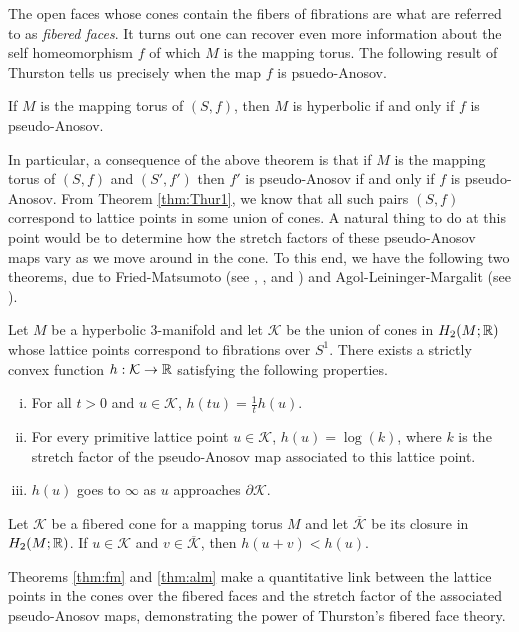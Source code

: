 The open faces whose cones contain the fibers of fibrations are what are referred to as
\emph{fibered faces}.  It turns out one can recover even more information about the self
homeomorphism $f$ of which $M$ is the mapping torus. The following result of Thurston tells us
precisely when the map $f$ is psuedo-Anosov.

\begin{thm}
    \label{thm:ThurHyp}
  If $M$ is the mapping torus of $(S, f)$, then $M$ is hyperbolic if and only if $f$ is pseudo-Anosov.
\end{thm}

In particular, a consequence of the above theorem is that if $M$ is the mapping torus of $(S, f)$
and $(S', f')$ then $f'$ is pseudo-Anosov if and only if $f$ is pseudo-Anosov. From Theorem
\ref{thm:Thur1}, we know that all such pairs $(S, f)$ correspond to lattice points in some union of
cones. A natural thing to do at this point would be to determine how the stretch factors of these
pseudo-Anosov maps vary as we move around in the cone. To this end, we have the following two
theorems, due to Fried-Matsumoto (see \cite{fried1982flow}, \cite{fried1983transitive}, and
\cite{matsumoto1987topological}) and Agol-Leininger-Margalit (see \cite{agol6983pseudo}).

\begin{thm}
  \label{thm:fm}
  Let $M$ be a hyperbolic $3$-manifold and let $\mathcal{K}$ be the union of cones in
  $H_2(M; \mathbb{R})$ whose lattice points correspond to fibrations over $S^1$.  There exists a strictly
  convex function $h: \mathcal{K} \to \mathbb{R}$ satisfying the following properties.
  \begin{enumerate}[(i)]
  \item For all $t > 0$ and $u \in \mathcal{K}$, $h(tu) =  \frac{1}{t}h(u)$.
  \item For every primitive lattice point $u \in \mathcal{K}$, $h(u) = \log(k)$, where $k$ is the
    stretch factor of the pseudo-Anosov map associated to this lattice point.
  \item $h(u)$ goes to $\infty$ as $u$ approaches $\partial \mathcal{K}$.
  \end{enumerate}
\end{thm}

\begin{thm}
  \label{thm:alm}
  Let $\mathcal{K}$ be a fibered cone for a mapping torus $M$ and let $\overline{\mathcal{K}}$ be its closure
  in $H_2(M;\mathbb{R})$. If $u \in \mathcal{K}$ and $v \in \overline{\mathcal{K}}$, then $h(u+v) < h(u)$.
\end{thm}
Theorems \ref{thm:fm} and \ref{thm:alm} make a quantitative link between the lattice points in the cones over
the fibered faces and the stretch factor of the associated pseudo-Anosov maps, demonstrating the power of
Thurston's fibered face theory.

